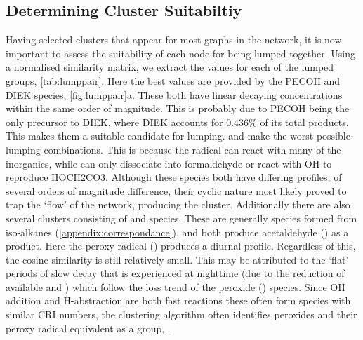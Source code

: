 \subsection{Determining Cluster Suitabiltiy}
Having selected clusters that appear for most graphs in the network, it is now important to assess the suitability of each node for being lumped together. Using a normalised similarity matrix, we extract the values for each of the lumped groups, \autoref{tab:lumppair}. Here the best values are provided by the PECOH and DIEK species, \autoref{fig:lumppair}a. These both have linear decaying concentrations within the same order of magnitude. This is probably due to PECOH being the only precursor to DIEK, where DIEK accounts for 0.436\% of its total products. This makes them a suitable candidate for lumping.
 and  make the worst possible lumping combinations. This is because the radical  can react with many of the inorganics, while  can only dissociate into formaldehyde or react with OH to reproduce HOCH2CO3. Although these species both have differing profiles, of several orders of magnitude difference, their cyclic nature  most likely proved to trap the `flow' of the network, producing the cluster. Additionally there are also several clusters consisting of  and  species. These are generally species formed from iso-alkanes (\autoref{appendix:correspondance}), and both produce acetaldehyde () as a product. Here the peroxy radical () produces a diurnal profile. Regardless of this, the cosine similarity is still relatively small. This may be attributed to the `flat' periods of slow decay that is experienced at nighttime (due to the reduction of available  and ) which follow the loss trend of the peroxide () species. Since OH addition and H-abstraction are both fast reactions these often form species with similar CRI numbers, the clustering algorithm often identifies peroxides and their peroxy radical equivalent as a group, . \\



